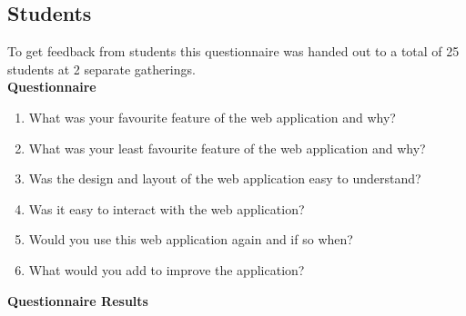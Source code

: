 \documentclass[a4paper, 12pt]{report}
\begin{document}
\subsection{Students}
To get feedback from students this questionnaire was handed out to a total of 25 students at 2 separate gatherings.\\
\textbf{Questionnaire}
\begin{enumerate}
\item What was your favourite feature of the web application and why?
\item What was your least favourite feature of the web application and why?
\item Was the design and layout of the web application easy to understand?
\item Was it easy to interact with the web application?
\item Would you use this web application again and if so when?
\item What would you add to improve the application?
\end{enumerate}
\textbf{Questionnaire Results}
\end{document}

